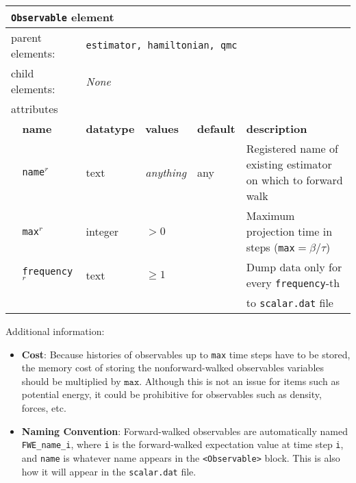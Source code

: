 \begin{table}[h]
\begin{center}
\begin{tabularx}{\textwidth}{l l l l l X }
\hline
\multicolumn{6}{l}{\texttt{Observable} element} \\
\hline
\multicolumn{2}{l}{parent elements:} & \multicolumn{4}{l}{\texttt{estimator, hamiltonian, qmc}}\\
\multicolumn{2}{l}{child  elements:} & \multicolumn{4}{l}{\textit{None}}\\
\multicolumn{2}{l}{attributes}  & \multicolumn{4}{l}{}\\
   & \bfseries name       & \bfseries datatype & \bfseries values  & \bfseries default   & \bfseries description \\
   & \texttt{name}$^r$    &  text              & \textit{anything} & any                 & Registered name of existing estimator on which to forward walk \\
   & \texttt{max}$^r$     &  integer             & $ > 0$     &                     & Maximum projection time in steps (\texttt{max}$=\beta/\tau$)      \\
   & \texttt{frequency}$^r$     &  text              & $\geq 1$      &                & Dump data only for every \texttt{frequency}-th  \\
      &  &               &     &                & to \texttt{scalar.dat} file   \\

  \hline
\end{tabularx}
\end{center}
\end{table}

Additional information:
\begin{itemize}
  \item{\textbf{Cost}:  Because histories of observables up to \texttt{max} time steps have to be stored, the memory cost of storing the nonforward-walked observables variables should be multiplied by $\texttt{max}$.  Although this is not an issue for items such as potential energy, it could be prohibitive for observables such as density, forces, etc.  }
  \item{\textbf{Naming Convention}: Forward-walked observables are automatically named \texttt{FWE\_name\_i}, where \texttt{i} is the forward-walked expectation value at time step \texttt{i}, and \texttt{name} is whatever name appears in the \texttt{<Observable>} block.  This is also how it will appear in the \texttt{scalar.dat} file.  }
\end{itemize}

